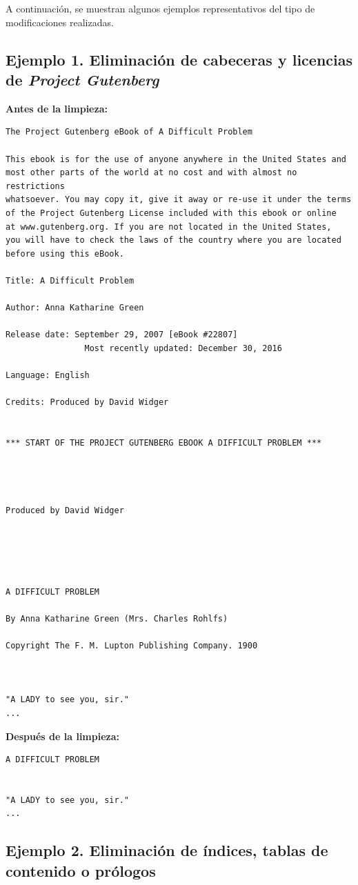\documentclass[IB]{TFUOC}%
\begin{document}
A continuación, se muestran algunos ejemplos representativos del tipo de modificaciones realizadas.

\subsection*{Ejemplo 1. Eliminación de cabeceras y licencias de \textit{Project Gutenberg}}

\textbf{Antes de la limpieza:}

\begin{verbatim}
The Project Gutenberg eBook of A Difficult Problem

This ebook is for the use of anyone anywhere in the United States and
most other parts of the world at no cost and with almost no restrictions
whatsoever. You may copy it, give it away or re-use it under the terms
of the Project Gutenberg License included with this ebook or online
at www.gutenberg.org. If you are not located in the United States,
you will have to check the laws of the country where you are located
before using this eBook.

Title: A Difficult Problem

Author: Anna Katharine Green

Release date: September 29, 2007 [eBook #22807]
                Most recently updated: December 30, 2016

Language: English

Credits: Produced by David Widger


*** START OF THE PROJECT GUTENBERG EBOOK A DIFFICULT PROBLEM ***




Produced by David Widger





A DIFFICULT PROBLEM

By Anna Katharine Green (Mrs. Charles Rohlfs)

Copyright The F. M. Lupton Publishing Company. 1900



"A LADY to see you, sir."
...
\end{verbatim}

\textbf{Después de la limpieza:}

\begin{verbatim}
A DIFFICULT PROBLEM


"A LADY to see you, sir."
...
\end{verbatim}

\subsection*{Ejemplo 2. Eliminación de índices, tablas de contenido o prólogos}
\end{document}
